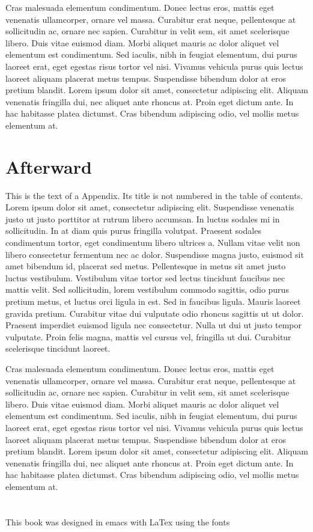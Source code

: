 \documentclass[12pt]{memoir}
\begin{document}
Cras malesuada elementum condimentum. Donec lectus eros, mattis eget venenatis ullamcorper, ornare vel massa. Curabitur erat neque, pellentesque at sollicitudin ac, ornare nec sapien. Curabitur in velit sem, sit amet scelerisque libero. Duis vitae euismod diam. Morbi aliquet mauris ac dolor aliquet vel elementum est condimentum. Sed iaculis, nibh in feugiat elementum, dui purus laoreet erat, eget egestas risus tortor vel nisi. Vivamus vehicula purus quis lectus laoreet aliquam placerat metus tempus. Suspendisse bibendum dolor at eros pretium blandit. Lorem ipsum dolor sit amet, consectetur adipiscing elit. Aliquam venenatis fringilla dui, nec aliquet ante rhoncus at. Proin eget dictum ante. In hac habitasse platea dictumst. Cras bibendum adipiscing odio, vel mollis metus elementum at.


\backmatter

\chapter*{Afterward}
This is the text of a Appendix. Its title is not numbered in the table of contents. Lorem ipsum dolor sit amet, consectetur adipiscing elit. Suspendisse venenatis justo ut justo porttitor at rutrum libero accumsan. In luctus sodales mi in sollicitudin. In at diam quis purus fringilla volutpat. Praesent sodales condimentum tortor, eget condimentum libero ultrices a. Nullam vitae velit non libero consectetur fermentum nec ac dolor. Suspendisse magna justo, euismod sit amet bibendum id, placerat sed metus. Pellentesque in metus sit amet justo luctus vestibulum. Vestibulum vitae tortor sed lectus tincidunt faucibus nec mattis velit. Sed sollicitudin, lorem vestibulum commodo sagittis, odio purus pretium metus, et luctus orci ligula in est. Sed in faucibus ligula. Mauris laoreet gravida pretium. Curabitur vitae dui vulputate odio rhoncus sagittis ut ut dolor. Praesent imperdiet euismod ligula nec consectetur. Nulla ut dui ut justo tempor vulputate. Proin felis magna, mattis vel cursus vel, fringilla ut dui. Curabitur scelerisque tincidunt laoreet.

Cras malesuada elementum condimentum. Donec lectus eros, mattis eget venenatis ullamcorper, ornare vel massa. Curabitur erat neque, pellentesque at sollicitudin ac, ornare nec sapien. Curabitur in velit sem, sit amet scelerisque libero. Duis vitae euismod diam. Morbi aliquet mauris ac dolor aliquet vel elementum est condimentum. Sed iaculis, nibh in feugiat elementum, dui purus laoreet erat, eget egestas risus tortor vel nisi. Vivamus vehicula purus quis lectus laoreet aliquam placerat metus tempus. Suspendisse bibendum dolor at eros pretium blandit. Lorem ipsum dolor sit amet, consectetur adipiscing elit. Aliquam venenatis fringilla dui, nec aliquet ante rhoncus at. Proin eget dictum ante. In hac habitasse platea dictumst. Cras bibendum adipiscing odio, vel mollis metus elementum at.

\clearpage
{}
\printindex

\chapter*{}
This book was designed in emacs with LaTex using the fonts
\end{document}
